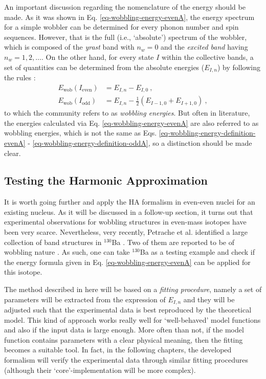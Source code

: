 An important discussion regarding the nomenclature of the energy should be made. As it was shown in Eq. \ref{eq-wobbling-energy-evenA}, the energy spectrum for a simple wobbler can be determined for every phonon number and spin sequences. However, that is the full (i.e., `absolute') spectrum  of the wobbler, which is composed of the \emph{yrast} band with $n_w=0$ and the \emph{excited band} having $n_w=1,2,\dots$. On the other hand, for every state $I$ within the collective bands, a set of quantities can be determined from the absolute energies ($E_{I,n}$) by following the rules \cite{wen2015wobbling}:
\begin{align}
    E_\text{wob}(I_\text{even})&=E_{I,n}-E_{I,0}\ , \label{eq-wobbling-energy-definition-evenA} \\
    E_\text{wob}(I_\text{odd})&=E_{I,n}-\frac{1}{2}\left(E_{I-1,0}+E_{I+1,0}\right)\ ,
    \label{eq-wobbling-energy-definition-oddA}
\end{align}
to which the community refers to as \emph{wobbling energies}. But often in literature, the energies calculated via Eq. \ref{eq-wobbling-energy-evenA} are also referred to as wobbling energies, which is not the same as Eqs. \ref{eq-wobbling-energy-definition-evenA} - \ref{eq-wobbling-energy-definition-oddA}, so a distinction should be made clear.

\subsection{Testing the Harmonic Approximation}
\label{ba-130-numerical-calculations}

It is worth going further and apply the HA formalism in even-even nuclei for an existing nucleus. As it will be discussed in a follow-up section, it turns out that experimental observations for wobbling structures in even-mass isotopes have been very scarce. Nevertheless, very recently, Petrache et al. identified a large collection of band structures in $^{130}$Ba \cite{petrache2019diversity}. Two of them are reported to be of wobbling nature \cite{chen2019transverse}. As such, one can take $^{130}$Ba as a testing example and check if the energy formula given in Eq. \ref{eq-wobbling-energy-evenA} can be applied for this isotope.

The method described in here will be based on a \emph{fitting procedure}, namely a set of parameters will be extracted from the expression of $E_{I,n}$ and they will be adjusted such that the experimental data is best reproduced by the theoretical model. This kind of approach works really well for `well-behaved' model functions and also if the input data is large enough. More often than not, if the model function contains parameters with a clear physical meaning, then the fitting becomes a suitable tool. In fact, in the following chapters, the developed formalism will verify the experimental data through similar fitting procedures (although their `core'-implementation will be more complex).

